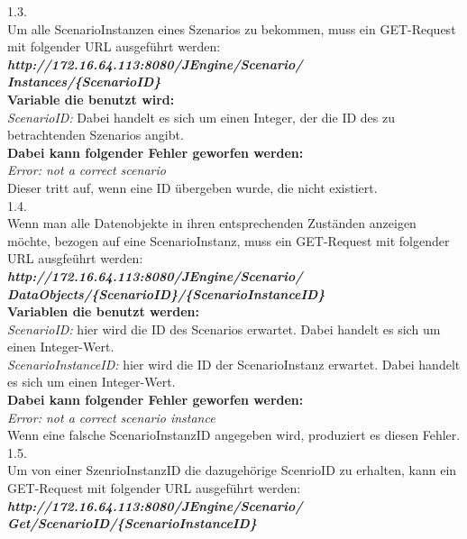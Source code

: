 \documentclass{acm_proc_article-sp}
\begin{document}
\begin{enumerate}
1.3.\\ Um alle ScenarioInstanzen eines Szenarios zu bekommen, muss ein GET-Request mit folgender URL ausgeführt werden:\\
\textbf{\textit{http://172.16.64.113:8080/JEngine/Scenario/\\Instances/\{ScenarioID\}}}\\

\textbf{Variable die benutzt wird:}\\
\textit{ScenarioID:} Dabei handelt es sich um einen Integer, der die ID des zu betrachtenden Szenarios angibt.\\

\textbf{Dabei kann folgender Fehler geworfen werden:}\\
\textit{Error: not a correct scenario}\\ Dieser tritt auf, wenn eine ID übergeben wurde, die nicht existiert.\\

1.4.\\ Wenn man alle Datenobjekte in ihren entsprechenden Zuständen anzeigen möchte, bezogen auf eine ScenarioInstanz, muss ein GET-Request mit folgender URL ausgfeührt werden:\\
\textbf{\textit{http://172.16.64.113:8080/JEngine/Scenario/\\DataObjects/\{ScenarioID\}/\{ScenarioInstanceID\}}}\\

\textbf{Variablen die benutzt werden:}\\
\textit{ScenarioID:} hier wird die ID des Scenarios erwartet. Dabei handelt es sich um einen Integer-Wert.\\
\textit{ScenarioInstanceID:} hier wird die ID der ScenarioInstanz erwartet. Dabei handelt es sich um einen Integer-Wert.\\

\textbf{Dabei kann folgender Fehler geworfen werden:}\\
\textit{Error: not a correct scenario instance}\\ Wenn eine falsche ScenarioInstanzID angegeben wird, produziert es diesen Fehler.\\

1.5.\\ Um von einer SzenrioInstanzID die dazugehörige ScenrioID zu erhalten, kann ein GET-Request mit folgender URL ausgeführt werden:\\ 
\textbf{\textit{http://172.16.64.113:8080/JEngine/Scenario/\\Get/ScenarioID/\{ScenarioInstanceID\}}}\\


\end{enumerate}
\end{document}
